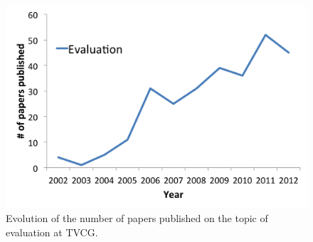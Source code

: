 

\begin{figure}[b]
\centering
\includegraphics[width=0.5\linewidth]{chapter6/figures/evaluation_tvcg.png}
  \caption{\label{fig:tvcg}Evolution of the number of papers published on the topic of evaluation at TVCG.}
\end{figure}
 
